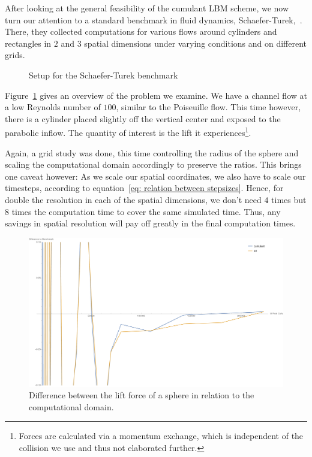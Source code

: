 After looking at the general feasibility of the cumulant LBM scheme, we now turn our attention to a standard benchmark in fluid dynamics, Schaefer-Turek,~\cite{schafer1996benchmark}.
There, they collected computations for various flows around cylinders and rectangles in $2$ and $3$ spatial dimensions under varying conditions and on different grids.

\begin{figure}
  \centering
  
  \caption{Setup for the Schaefer-Turek benchmark}
\label{fig: schaeferTurek}
\end{figure}

Figure~\ref{fig: schaeferTurek} gives an overview of the problem we examine.
We have a channel flow at a low Reynolds number of $100$, similar to the Poiseuille flow.
This time however, there is a cylinder placed slightly off the vertical center and exposed to the parabolic inflow.
The quantity of interest is the lift it experiences\footnote{Forces are calculated via a momentum exchange, which is independent of the collision we use and thus not elaborated further.}.

Again, a grid study was done, this time controlling the radius of the sphere and scaling the computational domain accordingly to preserve the ratios.
This brings one caveat however:
As we scale our spatial coordinates, we also have to scale our timesteps, according to equation~\eqref{eq: relation between stepsizes}.
Hence, for double the resolution in each of the spatial dimensions, we don't need $4$ times but $8$ times the computation time to cover the same simulated time.
Thus, any savings in spatial resolution will pay off greatly in the final computation times.


\begin{figure}
  \centering
  \includegraphics[width=\linewidth]{../figures/schaeferTurekLift_nrFluidVsDiff.pdf} %
  \caption{Difference between the lift force of a sphere in relation to the computational domain.}
\label{fig: schaefer turek nrFluidVsDiff}
\end{figure}

